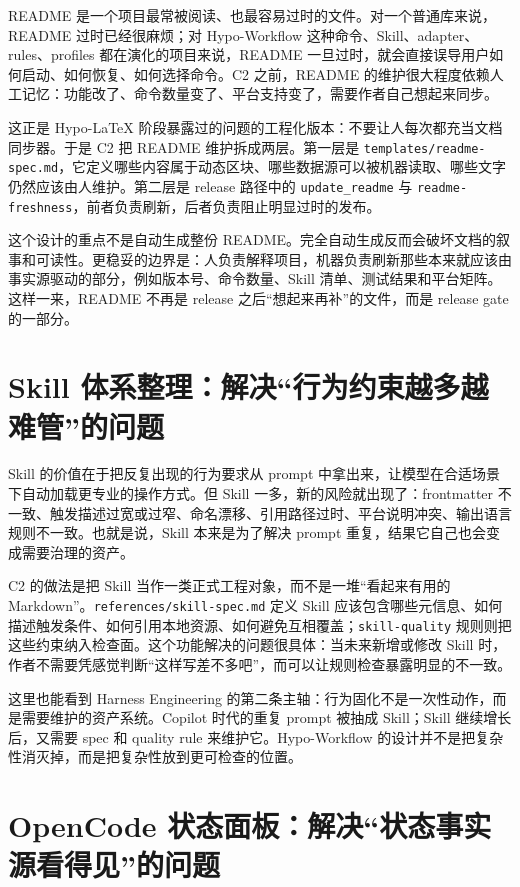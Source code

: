 \documentclass[
  outputdir=build,
  chapterstyle=cn,
  colorscheme=Simple,
  fontset=tech,
  code=false
]{Hypo-Note}
\begin{document}
README 是一个项目最常被阅读、也最容易过时的文件。对一个普通库来说，README 过时已经很麻烦；对 Hypo-Workflow 这种命令、Skill、adapter、rules、profiles 都在演化的项目来说，README 一旦过时，就会直接误导用户如何启动、如何恢复、如何选择命令。C2 之前，README 的维护很大程度依赖人工记忆：功能改了、命令数量变了、平台支持变了，需要作者自己想起来同步。

这正是 Hypo-LaTeX 阶段暴露过的问题的工程化版本：不要让人每次都充当文档同步器。于是 C2 把 README 维护拆成两层。第一层是 \texttt{templates/readme-spec.md}，它定义哪些内容属于动态区块、哪些数据源可以被机器读取、哪些文字仍然应该由人维护。第二层是 release 路径中的 \texttt{update\_readme} 与 \texttt{readme-freshness}，前者负责刷新，后者负责阻止明显过时的发布。

这个设计的重点不是自动生成整份 README。完全自动生成反而会破坏文档的叙事和可读性。更稳妥的边界是：人负责解释项目，机器负责刷新那些本来就应该由事实源驱动的部分，例如版本号、命令数量、Skill 清单、测试结果和平台矩阵。这样一来，README 不再是 release 之后“想起来再补”的文件，而是 release gate 的一部分。

\section{Skill 体系整理：解决“行为约束越多越难管”的问题}

Skill 的价值在于把反复出现的行为要求从 prompt 中拿出来，让模型在合适场景下自动加载更专业的操作方式。但 Skill 一多，新的风险就出现了：frontmatter 不一致、触发描述过宽或过窄、命名漂移、引用路径过时、平台说明冲突、输出语言规则不一致。也就是说，Skill 本来是为了解决 prompt 重复，结果它自己也会变成需要治理的资产。

C2 的做法是把 Skill 当作一类正式工程对象，而不是一堆“看起来有用的 Markdown”。\texttt{references/skill-spec.md} 定义 Skill 应该包含哪些元信息、如何描述触发条件、如何引用本地资源、如何避免互相覆盖；\texttt{skill-quality} 规则则把这些约束纳入检查面。这个功能解决的问题很具体：当未来新增或修改 Skill 时，作者不需要凭感觉判断“这样写差不多吧”，而可以让规则检查暴露明显的不一致。

这里也能看到 Harness Engineering 的第二条主轴：行为固化不是一次性动作，而是需要维护的资产系统。Copilot 时代的重复 prompt 被抽成 Skill；Skill 继续增长后，又需要 spec 和 quality rule 来维护它。Hypo-Workflow 的设计并不是把复杂性消灭掉，而是把复杂性放到更可检查的位置。

\section{OpenCode 状态面板：解决“状态事实源看得见”的问题}
\end{document}

